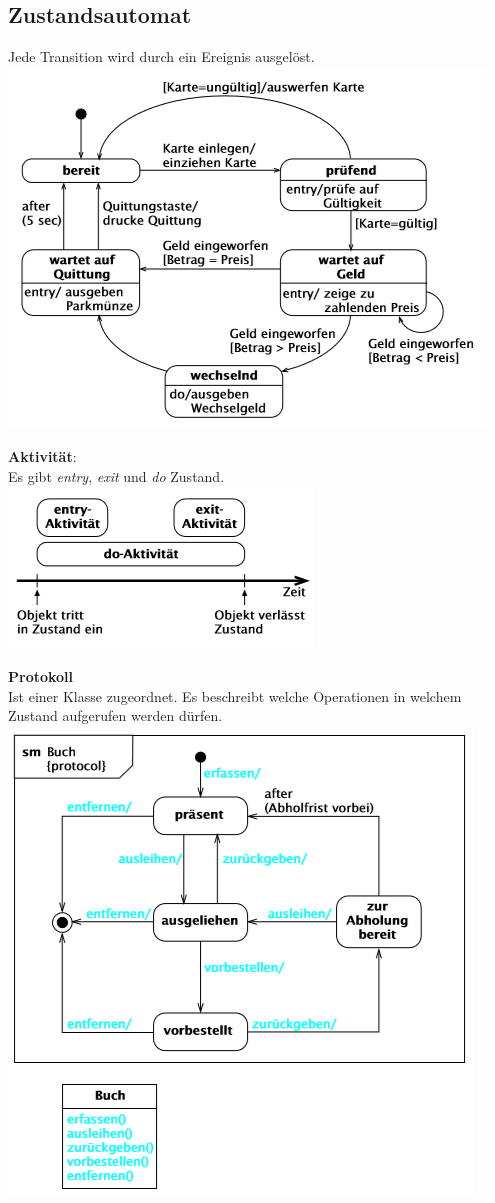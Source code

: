 \subsection{Zustandsautomat}
Jede Transition wird durch ein Ereignis ausgelöst.
\includegraphics[width=\columnwidth]{Images/zustandautomat}

\textbf{Aktivität}:\\ Es gibt \textit{entry}, \textit{exit} und \textit{do} Zustand.
\includegraphics[width=0.4\columnwidth]{Images/aktivität}

\textbf{Protokoll}\\ Ist einer Klasse zugeordnet. Es beschreibt welche Operationen in welchem Zustand aufgerufen werden dürfen.
\includegraphics[width=\columnwidth]{Images/protokoll}
